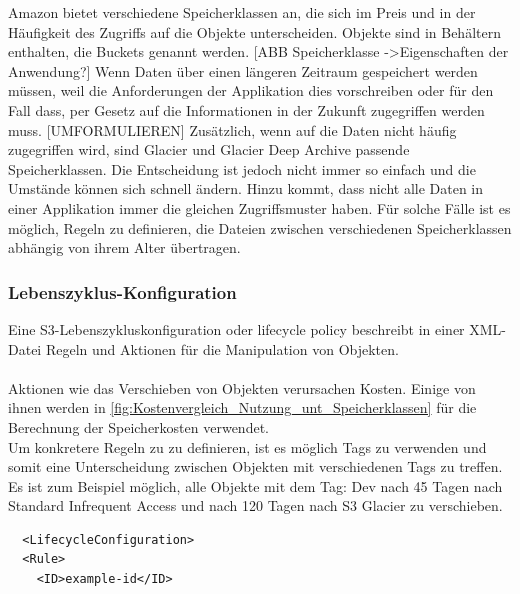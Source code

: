 {Amazon bietet verschiedene Speicherklassen an, die sich im Preis und in der Häufigkeit des Zugriffs auf die Objekte unterscheiden. Objekte sind in Behältern enthalten, die Buckets genannt werden.
[ABB Speicherklasse ->Eigenschaften der Anwendung?]
Wenn Daten über einen längeren Zeitraum gespeichert werden müssen, weil die Anforderungen der Applikation dies vorschreiben oder für den Fall dass, per Gesetz auf die Informationen in der Zukunft zugegriffen werden muss.
[UMFORMULIEREN]
Zusätzlich, wenn auf die Daten nicht häufig zugegriffen wird, sind Glacier und Glacier Deep Archive passende Speicherklassen. Die Entscheidung ist jedoch nicht immer so einfach und die Umstände können sich schnell ändern. Hinzu kommt, dass nicht alle Daten in einer Applikation immer die gleichen Zugriffsmuster haben. Für solche Fälle ist es möglich, Regeln zu definieren, die Dateien zwischen verschiedenen Speicherklassen abhängig von ihrem Alter übertragen.

\subsubsection{Lebenszyklus-Konfiguration}
Eine S3-Lebenszykluskonfiguration oder lifecycle policy beschreibt in einer XML-Datei Regeln und Aktionen für die Manipulation von Objekten.
\\\\
Aktionen wie das Verschieben von Objekten verursachen Kosten. Einige von ihnen werden in \autoref{fig:Kostenvergleich_Nutzung_unt_Speicherklassen} für die Berechnung der Speicherkosten verwendet.
\\
Um konkretere Regeln zu zu definieren, ist es möglich Tags zu verwenden und somit eine Unterscheidung zwischen Objekten mit verschiedenen Tags zu treffen.
Es ist zum Beispiel möglich, alle Objekte mit dem Tag: Dev nach 45 Tagen nach Standard Infrequent Access und nach 120 Tagen nach S3 Glacier zu verschieben.

\begin{lstlisting}
  <LifecycleConfiguration>
  <Rule>
    <ID>example-id</ID>
    

\end{lstlisting}}
